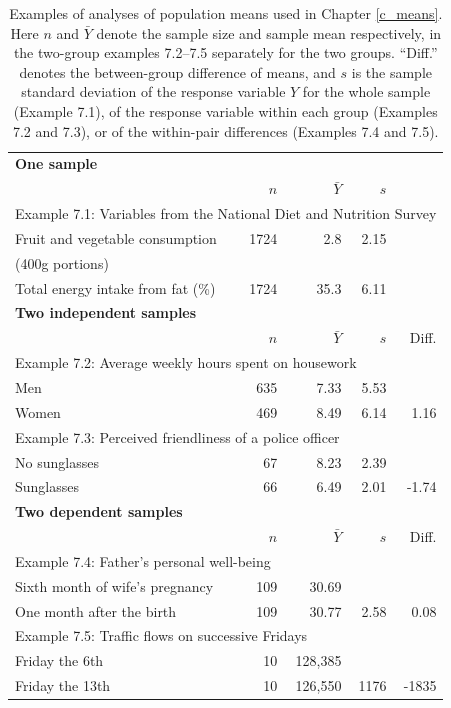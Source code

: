 \begin{table}
\caption{Examples of analyses of population means used in Chapter \ref{c_means}. Here $n$ and $\bar{Y}$ denote the sample size and sample mean respectively, in the two-group examples 7.2--7.5 separately for the two groups. ``Diff.'' denotes the between-group difference of means, and $s$ is the sample standard deviation of the response variable $Y$ for the whole sample (Example 7.1), of the response variable within each group (Examples 7.2 and 7.3), or of the within-pair differences (Examples 7.4 and 7.5).}
\label{t_groupex}
\begin{center}
\begin{tabular}{|lrrrr|}\hline
\multicolumn{5}{|l|}{\textbf{One sample}} \\
& $n$ & $\bar{Y}$ & $s$ &  \\ \hline
\multicolumn{5}{|l|}{Example 7.1: Variables from the National Diet and Nutrition Survey} \\
Fruit and vegetable consumption & 1724 & 2.8 & 2.15 & \\
(400g portions) & & & & \\
Total energy intake from fat (\%) & 1724 & 35.3& 6.11 & \\
\hline
\multicolumn{5}{|l|}{\textbf{Two independent samples}} \\
& $n$ & $\bar{Y}$ & $s$& Diff.  \\ \hline
\multicolumn{5}{|l|}{Example 7.2: Average weekly hours spent on housework} \\
Men & 635 & 7.33 & 5.53 & \\
Women & 469 & 8.49 & 6.14 & 1.16 \\
\multicolumn{5}{|l|}{Example 7.3: Perceived friendliness of a police officer} \\
No sunglasses & 67 & 8.23 & 2.39 &  \\
Sunglasses & 66 & 6.49 & 2.01 & -1.74 \\
\hline
\multicolumn{5}{|l|}{\textbf{Two dependent samples}}\\
& $n$ & $\bar{Y}$ & $s$ & Diff. \\ \hline
\multicolumn{5}{|l|}{Example 7.4: Father's personal well-being}\\
Sixth month of wife's pregnancy & 109 & 30.69 & & \\
One month after the birth & 109 & 30.77 & 2.58 & 0.08
\\
\multicolumn{5}{|l|}{Example 7.5: Traffic flows on successive Fridays}\\
Friday the 6th & 10 & 128,385 & &   \\
Friday the 13th & 10 & 126,550 & 1176 & -1835 \\
\hline
\end{tabular}
\end{center}
\end{table}

